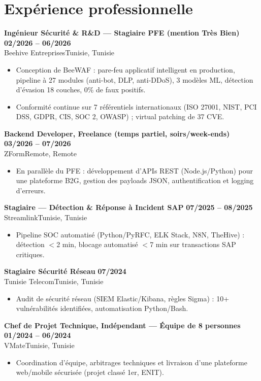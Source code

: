 \documentclass[a4paper,10pt]{article}
\newcommand{\cventry}[4]{\textbf{#1} \hfill \textbf{#4}\\[0.5pt]#2{\ifx\relax#3\relax\else, #3\fi}\par\vspace{1pt}}
\begin{document}
\section{Expérience professionnelle}
\cventry{Ingénieur Sécurité \& R\&D --- Stagiaire PFE (mention Très Bien)}{Beehive Entreprises}{Tunisie}{02/2026 -- 06/2026}
\begin{itemize}
  \item Conception de BeeWAF : pare-feu applicatif intelligent en production, pipeline à 27 modules (anti-bot, DLP, anti-DDoS), 3 modèles ML, détection d'évasion 18 couches, 0\% de faux positifs.
  \item Conformité continue sur 7 référentiels internationaux (ISO 27001, NIST, PCI DSS, GDPR, CIS, SOC 2, OWASP) ; virtual patching de 37 CVE.
\end{itemize}
\cventry{Backend Developer, Freelance (temps partiel, soirs/week-ends)}{ZForm}{Remote}{03/2026 -- 07/2026}
\begin{itemize}
  \item En parallèle du PFE : développement d'APIs REST (Node.js/Python) pour une plateforme B2G, gestion des payloads JSON, authentification et logging d'erreurs.
\end{itemize}
\cventry{Stagiaire --- Détection \& Réponse à Incident SAP}{Streamlink}{Tunisie}{07/2025 -- 08/2025}
\begin{itemize}
  \item Pipeline SOC automatisé (Python/PyRFC, ELK Stack, N8N, TheHive) : détection $<$2 min, blocage automatisé $<$7 min sur transactions SAP critiques.
\end{itemize}
\cventry{Stagiaire Sécurité Réseau}{Tunisie Telecom}{Tunisie}{07/2024}
\begin{itemize}
  \item Audit de sécurité réseau (SIEM Elastic/Kibana, règles Sigma) : 10+ vulnérabilités identifiées, automatisation Python/Bash.
\end{itemize}
\cventry{Chef de Projet Technique, Indépendant --- Équipe de 8 personnes}{VMate}{Tunisie}{01/2024 -- 06/2024}
\begin{itemize}
  \item Coordination d'équipe, arbitrages techniques et livraison d'une plateforme web/mobile sécurisée (projet classé 1er, ENIT).
\end{itemize}
\end{document}
